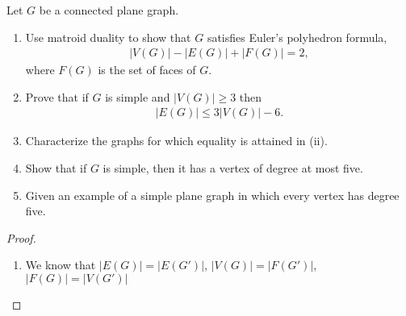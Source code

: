 \prob
{
    Let $G$ be a connected plane graph.
    \begin{enumerate}[label=(\roman*)]
        \item Use matroid duality to show that $G$ satisfies Euler's polyhedron formula,
                \begin{align}
                        |V(G)| - |E(G)| + |F(G)| = 2,
                \end{align}
                where $F(G)$ is the set of faces of $G$.
        \item Prove that if $G$ is simple and $|V(G)| \geq 3$ then
                \begin{align}
                    |E(G)| \leq 3|V(G)| - 6.
                \end{align}
                
        \item Characterize the graphs for which equality is attained in (ii).
        
        \item Show that if $G$ is simple, then it has a vertex of degree at most five.
        
        \item Given an example of a simple plane graph in which every vertex has degree five.
    \end{enumerate}
}
\begin{proof}
    \begin{enumerate}[label=(\roman*)]
        \item
            We know that $|E(G)| = |E(G')|$, $|V(G)| = |F(G')|$, $|F(G)| = |V(G')|$
    \end{enumerate}    
\end{proof}